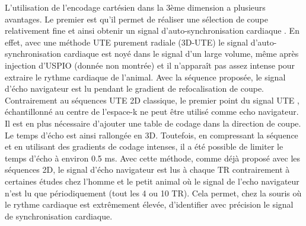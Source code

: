 L’utilisation de l’encodage cartésien dans la 3ème dimension a plusieurs avantages. Le premier est qu’il permet de réaliser une sélection de coupe relativement fine et ainsi obtenir un signal d’auto-synchronisation cardiaque \cite{crowe2004automated}. En effet, avec une méthode UTE purement radiale (3D-UTE) le signal d’auto-synchronisation cardiaque est noyé dans le signal d’un large volume, même après injection d’USPIO (donnée non montrée) et il n’apparaît pas assez intense pour extraire le rythme cardiaque de l’animal. Avec la séquence proposée, le signal d’écho navigateur est lu pendant le gradient de refocalisation de coupe. Contrairement au séquences UTE 2D classique, le premier point du signal UTE \cite{Hoerr:2013gf,Motaal:2015aa}, échantillonné au centre de l’espace-k ne peut être utilisé comme echo navigateur. Il est en plus nécessaire d’ajouter une table de codage dans la direction de coupe. Le temps d’écho est ainsi rallongée en 3D. Toutefois, en compressant la séquence et en utilisant des gradients de codage intenses, il a été possible de limiter le temps d’écho à environ 0.5 ms. Avec cette méthode, comme déjà proposé avec les séquences 2D, le signal d’écho navigateur est lus à chaque TR contrairement à certaines études chez l’homme \cite{coppo2014free} et le petit animal \cite{kramer2015self} où le signal de l’echo navigateur n’est lu que périodiquement (tout les 4 ou 10 TR). Cela permet, chez la souris où le rythme cardiaque est extrêmement élevée, d’identifier avec précision le signal de synchronisation cardiaque. 

